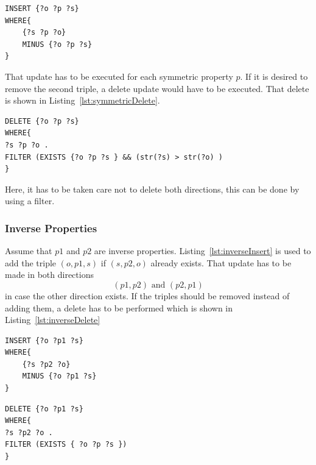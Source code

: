 \begin{lstlisting}[captionpos=b, caption=SPARQL update for adding triples with the symmetric property p., label=lst:symmetricInsert,
basicstyle=\ttfamily,frame=single,float=hbt,]
INSERT {?o ?p ?s}
WHERE{
	{?s ?p ?o}
	MINUS {?o ?p ?s}
}
\end{lstlisting}

That update has to be executed for each symmetric property $p$. If it is desired to remove the second triple, a delete update would have to be executed. That delete is shown in Listing~\ref{lst:symmetricDelete}.


\begin{lstlisting}[captionpos=b, caption=SPARQL update for removing triples with the symmetric property p., label=lst:symmetricDelete,
basicstyle=\ttfamily,frame=single,float=hbt,]
DELETE {?o ?p ?s}
WHERE{
?s ?p ?o .
FILTER (EXISTS {?o ?p ?s } && (str(?s) > str(?o) )
}
\end{lstlisting}

Here, it has to be taken care not to delete both directions, this can be done by using a filter.

\subsubsection{Inverse Properties}

Assume that $ p1 $ and $ p2 $ are inverse properties. Listing~\ref{lst:inverseInsert} is used to add the triple $(o,p1,s)$ if $(s,p2,o)$ already exists. That update has to be made in both directions  
\[
(p1,p2) \text{ and } (p2,p1)
\]
in case the other direction exists. If the triples should be removed instead of adding them, a delete has to be performed which is shown in Listing~\ref{lst:inverseDelete}

\begin{lstlisting}[captionpos=b, caption=SPARQL update for adding triples with the inverse properties p1 and p2., label=lst:inverseInsert,
basicstyle=\ttfamily,frame=single,float=hbt,]
INSERT {?o ?p1 ?s}
WHERE{
	{?s ?p2 ?o}
	MINUS {?o ?p1 ?s}
}
\end{lstlisting}



\begin{lstlisting}[captionpos=b, caption=SPARQL update for removing triples with the inverse properties p1 and p2., label=lst:inverseDelete,
basicstyle=\ttfamily,frame=single,float=hbt,]
DELETE {?o ?p1 ?s}
WHERE{
?s ?p2 ?o .
FILTER (EXISTS { ?o ?p ?s })
}
\end{lstlisting}

